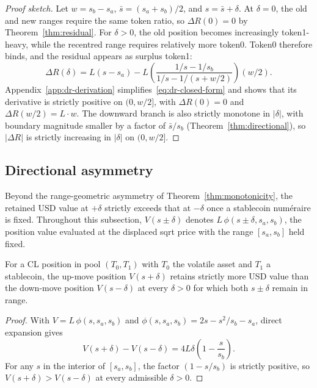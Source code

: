 \documentclass{manuscript}
\begin{document}
\begin{proof}[Proof sketch]
Let $w = s_b - s_a$, $\bar{s} = (s_a + s_b)/2$, and $s = \bar{s} + \delta$. At $\delta = 0$, the old and new ranges require the same token ratio, so $\Delta R(0) = 0$ by Theorem~\ref{thm:residual}. For $\delta > 0$, the old position becomes increasingly token1-heavy, while the recentred range requires relatively more token0. Token0 therefore binds, and the residual appears as surplus token1:
\begin{equation}\label{eq:dr-closed-form}
\Delta R(\delta) = L(s - s_a) - L\!\left(\frac{1/s - 1/s_b}{1/s - 1/(s + w/2)}\right)(w/2).
\end{equation}
Appendix~\ref{app:dr-derivation} simplifies~\eqref{eq:dr-closed-form} and shows that its derivative is strictly positive on $(0, w/2]$, with $\Delta R(0) = 0$ and $\Delta R(w/2) = L \cdot w$. The downward branch is also strictly monotone in $|\delta|$, with boundary magnitude smaller by a factor of $\bar{s}/s_b$ (Theorem~\ref{thm:directional}), so $|\Delta R|$ is strictly increasing in $|\delta|$ on $(0, w/2]$.
\end{proof}

\subsection{Directional asymmetry}\label{sec:directional}

Beyond the range-geometric asymmetry of Theorem~\ref{thm:monotonicity}, the retained USD value at $+\delta$ strictly exceeds that at $-\delta$ once a stablecoin num\'eraire is fixed. Throughout this subsection, $V(s \pm \delta)$ denotes $L\,\phi(s \pm \delta, s_a, s_b)$, the position value evaluated at the displaced sqrt price with the range $[s_a, s_b]$ held fixed.

\begin{theorem}\label{thm:directional}
For a CL position in pool $(T_0, T_1)$ with $T_0$ the volatile asset and $T_1$ a stablecoin, the up-move position $V(s+\delta)$ retains strictly more USD value than the down-move position $V(s-\delta)$ at every $\delta > 0$ for which both $s \pm \delta$ remain in range.
\end{theorem}

\begin{proof}
With $V = L\,\phi(s, s_a, s_b)$ and $\phi(s, s_a, s_b) = 2s - s^2/s_b - s_a$, direct expansion gives
\begin{equation}\label{eq:directional-identity}
V(s + \delta) - V(s - \delta) = 4 L \delta \left(1 - \frac{s}{s_b}\right).
\end{equation}
For any $s$ in the interior of $[s_a, s_b]$, the factor $(1 - s/s_b)$ is strictly positive, so $V(s+\delta) > V(s-\delta)$ at every admissible $\delta > 0$.
\end{proof}
\end{document}
